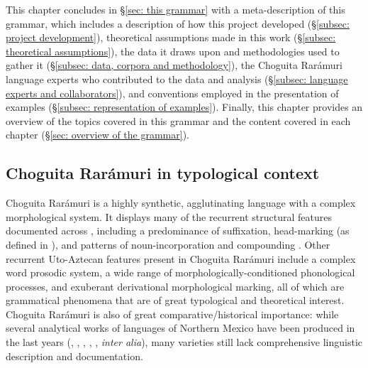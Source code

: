 This chapter concludes in §\ref{sec: this grammar} with a meta-description of this grammar, which includes a description of how this project developed (§\ref{subsec: project development}), theoretical assumptions made in this work (§\ref{subsec: theoretical assumptions}), the data it draws upon and methodologies used to gather it (§\ref{subsec: data, corpora and methodology}), the Choguita Rarámuri language experts who contributed to the data and analysis (§\ref{subsec: language experts and collaborators}), and conventions employed in the presentation of examples (§\ref{subsec: representation of examples}). Finally, this chapter provides an overview of the topics covered in this grammar and the content covered in each chapter (§\ref{sec: overview of the grammar}).

\subsection{Choguita Rarámuri in typological context}
\label{subsec: Choguita Rarámuri in typological context}


Choguita Rarámuri is a highly synthetic, agglutinating language with a complex morphological system. It displays many of the recurrent structural features documented across , including a predominance of suffixation, head-marking (as defined in \citet{nichols1986head}), and patterns of noun-incorporation and compounding \citep{sapir1921introduction,whorf1935comparative,haugen2008morphology}. Other recurrent Uto-Az\-tec\-an features present in Choguita Rarámuri include a complex word prosodic system, a wide range of morphologically-conditioned phonological processes, and exuberant derivational morphological marking, all of which are grammatical phenomena that are of great typological and theoretical interest. Choguita Rarámuri is also of great comparative/historical importance: while several analytical works of  languages of Northern Mexico have been produced in the last years (\citealt{valenzuela2006structure}, \citealt{garcia2014clause}, \citealt{reyes2014fonologia}, \citealt{moralesmoreno2016rochecahi}, \citealt{villalpando2019grammatical}, \textit{inter alia}), many varieties still lack comprehensive linguistic description and documentation.

